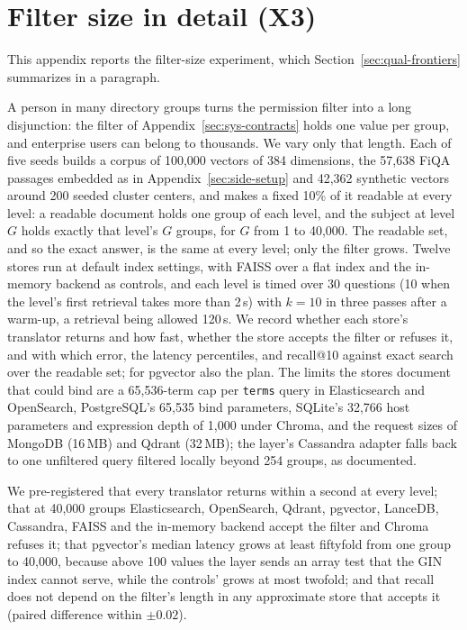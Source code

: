 
\section{Filter size in detail (X3)}\label{sec:qual-size}

This appendix reports the filter-size experiment, which Section~\ref{sec:qual-frontiers} summarizes in a paragraph.

A person in many directory groups turns the permission filter into a long disjunction: the filter of
Appendix~\ref{sec:sys-contracts} holds one value per group, and enterprise users can belong to
thousands. We vary only that length. Each of five seeds builds a corpus of 100,000 vectors of 384
dimensions, the 57,638 FiQA passages embedded as in Appendix~\ref{sec:side-setup} and 42,362 synthetic
vectors around 200 seeded cluster centers, and makes a fixed 10\% of it readable at every level: a
readable document holds one group of each level, and the subject at level $G$ holds exactly that
level's $G$ groups, for $G$ from 1 to 40,000. The readable set, and so the exact answer, is the same
at every level; only the filter grows. Twelve stores run at default index settings, with FAISS
over a flat index and the in-memory backend as controls, and each level is timed over 30 questions
(10 when the level's first retrieval takes more than 2\,s) with $k = 10$ in three passes after a
warm-up, a retrieval being allowed 120\,s. We record whether
each store's translator returns and how fast, whether the store accepts the filter or refuses it,
and with which error, the latency percentiles, and recall@10 against exact search over the readable
set; for pgvector also the plan. The limits the stores document that could bind are a 65,536-term
cap per \texttt{terms} query in Elasticsearch and OpenSearch, PostgreSQL's 65,535 bind parameters,
SQLite's 32,766 host parameters and expression depth of 1,000 under Chroma, and the request sizes of
MongoDB (16\,MB) and Qdrant (32\,MB); the layer's Cassandra adapter falls back to one unfiltered
query filtered locally beyond 254 groups, as documented.

We pre-registered that every translator returns within a second at every level; that at 40,000
groups Elasticsearch, OpenSearch, Qdrant, pgvector, LanceDB, Cassandra, FAISS and the in-memory
backend accept the filter and Chroma refuses it; that pgvector's median latency grows at least
fiftyfold from one group to 40,000, because above 100 values the layer sends an array test that the
GIN index cannot serve, while the controls' grows at most twofold; and that recall does not depend
on the filter's length in any approximate store that accepts it (paired difference within
$\pm 0.02$).

